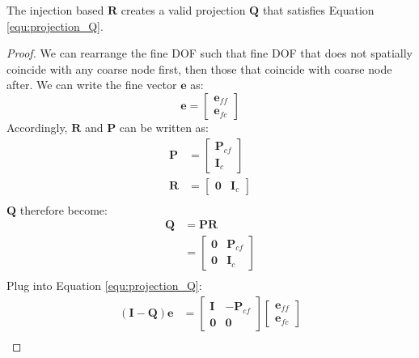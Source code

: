 \begin{lem}\label{lemma:injection}The injection based $\mathbf{R}$ creates a valid projection $\mathbf{Q}$ that satisfies Equation \ref{equ:projection_Q}.\end{lem}
\begin{proof}
We can rearrange the fine DOF such that fine DOF that does not spatially coincide with any coarse node first, then those that coincide with coarse node after. We can write the fine vector $\mathbf{e}$ as:
\begin{equation*}
\mathbf{e} = \left[ \begin{aligned}
    \mathbf{e}_{ff}\\
    \mathbf{e}_{fc}
  \end{aligned}\right]
\end{equation*}
Accordingly, $\mathbf{R}$ and $\mathbf{P}$ can be written as:
\begin{align*}
\mathbf{P} &= \left[ \begin{array}{c}
    \mathbf{P}_{cf}\\
    \mathbf{I}_{c}
  \end{array}\right]\\
  \mathbf{R} &= \left[ \begin{array}{cc}
    \mathbf{0} & \mathbf{I}_{c}
  \end{array}\right]\\
 \end{align*}
 $\mathbf{Q}$ therefore become:
 \begin{align*}
  \mathbf{Q} &= \mathbf{P}\mathbf{R} \\
  &= \left[ \begin{array}{cc}
    \mathbf{0} & \mathbf{P}_{cf} \\
    \mathbf{0} & \mathbf{I}_c
  \end{array}\right]\\
 \end{align*}
 Plug into Equation \ref{equ:projection_Q}:
 \begin{align*}
(\mathbf{I} - \mathbf{Q})\mathbf{e} &= \left[ \begin{array}{cc}
    \mathbf{I} & -\mathbf{P}_{cf} \\
    \mathbf{0} & \mathbf{0}
  \end{array}\right] \left[ \begin{array}{c}
    \mathbf{e}_{ff}\\
    \mathbf{e}_{fc}
  \end{array}\right]\\

\end{align*}
\end{proof}
